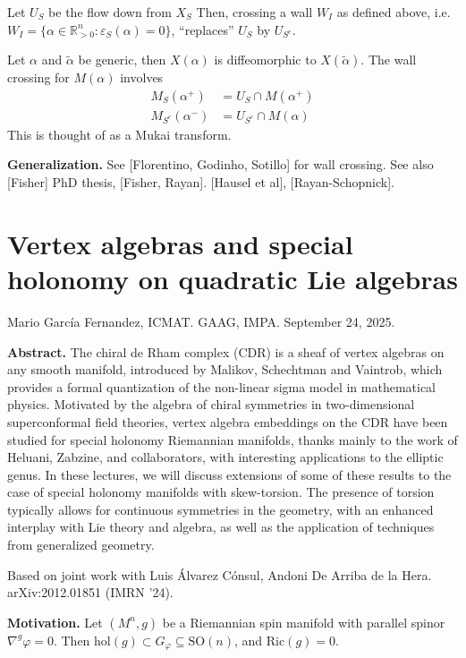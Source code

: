 Let $U_S$ be the flow down from $X_S$
Then, crossing a wall  $W_I$ as defined
above,
i.e. $W_I=\{\alpha \in
\mathbb{R}^n_{>0}:\varepsilon_S(\alpha)=0\}$,
``replaces'' $U_S$ by $U_{S^c}$.

Let $\alpha$ and $\tilde{\alpha}$ be generic,
then $X(\alpha)$ is diffeomorphic to
$X(\tilde{\alpha})$.
The wall crossing for $M(\alpha)$
involves
$$
\begin{aligned}
M_S(\alpha^+)&=U_S \cap M(\alpha^+)\\
M_{S^c}(\alpha^-)&=U_{S^c}\cap M(\alpha)
\end{aligned}
$$
This is thought of as a Mukai transform.

\medskip\noindent
{\bf Generalization.}
See [Florentino, Godinho, Sotillo] for wall
crossing.
See also [Fisher] PhD thesis, [Fisher,
Rayan].
[Hausel et al], [Rayan-Schopnick].

\section{Vertex algebras and special holonomy
on quadratic Lie algebras}
\label{section-verte-algeb-speci-holon}

\noindent
Mario García Fernandez, ICMAT.
GAAG, IMPA.
September 24, 2025.

\medskip\noindent
{\bf Abstract.}
The chiral de Rham complex (CDR) is a sheaf
of vertex algebras on any smooth
manifold, introduced by Malikov, Schechtman
and Vaintrob, which provides a
formal quantization of the non-linear sigma
model in mathematical physics.
Motivated by the algebra of chiral symmetries
in two-dimensional superconformal
field theories, vertex algebra embeddings on
the CDR have been studied for
special holonomy Riemannian manifolds, thanks
mainly to the work of Heluani,
Zabzine, and collaborators, with interesting
applications to the elliptic genus.
In these lectures, we will discuss extensions
of some of these results to the
case of special holonomy manifolds with
skew-torsion. The presence of torsion
typically allows for continuous symmetries in
the geometry, with an enhanced
interplay with Lie theory and algebra, as
well as the application of techniques
from generalized geometry.


\medskip\noindent
Based on joint work with Luis Álvarez Cónsul,
Andoni De Arriba de la Hera. arXiv:2012.01851
(IMRN '24).

\medskip\noindent
{\bf Motivation.}
Let $(M^n,g)$ be a Riemannian spin manifold
with
parallel spinor $\nabla^g \varphi=0$.
Then $\text{hol}(g) \subset G_\varphi
\subseteq \text{SO}(n)$,
and $\text{Ric}(g)=0$.

